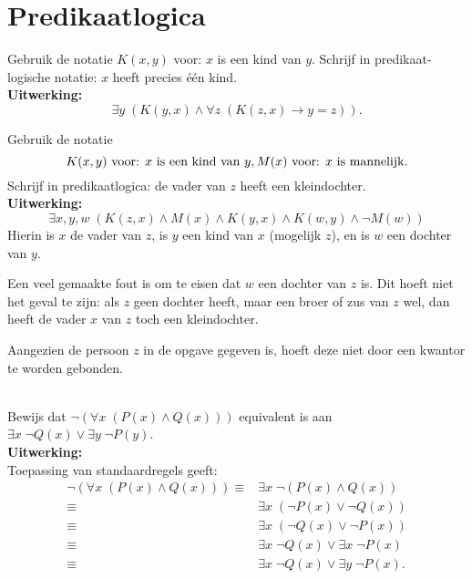 \section{Predikaatlogica}
\setcounter{answerT}{0}
\begin{answer}
Gebruik de notatie $K(x,y)$ voor: $x$ is een kind van $y$. Schrijf in predikaat-logische notatie: $x$ heeft precies \'e\'en kind.\\[2.5pt]

\noindent\textbf{Uitwerking:}
$$\exists y\;(K(y,x)\land \forall z\;(K(z,x)\rightarrow y=z)).$$
\end{answer}

\begin{answer}
Gebruik de notatie
$$K(x,y)\text{ voor: $x$ is een kind van $y$},\\
M(x)\text{ voor: $x$ is mannelijk.}$$
Schrijf in predikaatlogica: de vader van $z$ heeft een kleindochter.\\[2.5pt]

\noindent\textbf{Uitwerking:}
$$\exists x,y,w\;(K(z,x)\land M(x)\land K(y,x)\land K(w,y)\land\neg M(w))$$
Hierin is $x$ de vader van $z$, is $y$ een kind van $x$ (mogelijk $z$), en is $w$ een dochter van $y$.

Een veel gemaakte fout is om te eisen dat $w$ een dochter van $z$ is. Dit hoeft niet het geval te zijn: als $z$ geen dochter heeft, maar een broer of zus van $z$ wel, dan heeft de vader $x$ van $z$ toch een kleindochter.

Aangezien de persoon $z$ in de opgave gegeven is, hoeft deze niet door een kwantor te worden gebonden.
\end{answer}

\begin{answer}\mbox{}\\
Bewijs dat $\neg(\forall x\;(P(x)\land Q(x)))$ equivalent is aan $\exists x\;\neg Q(x)\lor\exists y\;\neg P(y)$.\\[2.5pt]

\noindent\textbf{Uitwerking:}\\
Toepassing van standaardregels geeft:
$$\begin{array}{rll}
     \neg(\forall x\;(P(x)\land Q(x)))\equiv & \exists x\;\neg(P(x)\land Q(x))\\
     \equiv & \exists x\;(\neg P(x)\lor\neg Q(x))\\
     \equiv & \exists x\;(\neg Q(x)\lor\neg P(x))\\
     \equiv & \exists x\;\neg Q(x)\lor \exists x\;\neg P(x)\\
     \equiv & \exists x\;\neg Q(x)\lor \exists y\;\neg P(x).
\end{array}$$
\end{answer}

